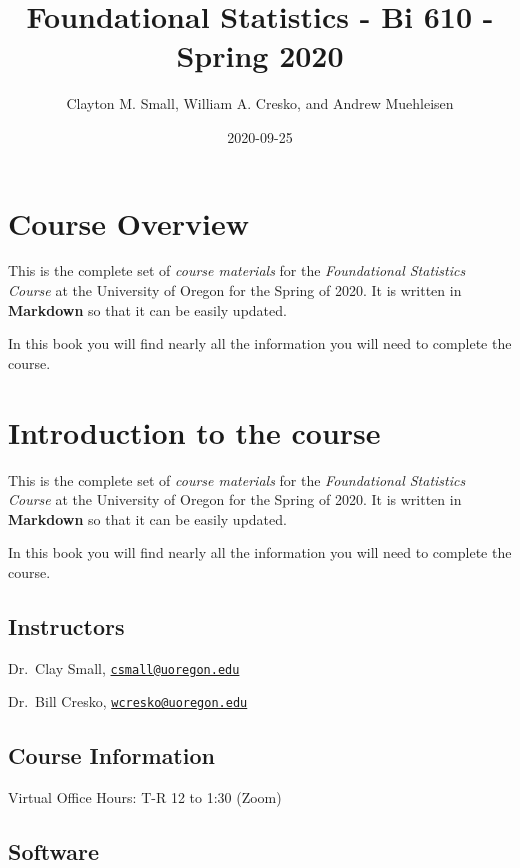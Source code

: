 \documentclass[]{book}
\title{Foundational Statistics - Bi 610 - Spring 2020}
\author{Clayton M. Small, William A. Cresko, and Andrew Muehleisen}
\date{2020-09-25}
\begin{document}
\maketitle

{
\setcounter{tocdepth}{1}
\tableofcontents
}
\hypertarget{course-overview}{%
\chapter{Course Overview}\label{course-overview}}

This is the complete set of \emph{course materials} for the \emph{Foundational Statistics Course} at the University of Oregon for the Spring of 2020. It is written in \textbf{Markdown} so that it can be easily updated.

In this book you will find nearly all the information you will need to complete the course.

\hypertarget{introduction-to-the-course}{%
\chapter{Introduction to the course}\label{introduction-to-the-course}}

This is the complete set of \emph{course materials} for the \emph{Foundational Statistics Course} at the University of Oregon for the Spring of 2020. It is written in \textbf{Markdown} so that it can be easily updated.

In this book you will find nearly all the information you will need to complete the course.

\hypertarget{instructors}{%
\section{Instructors}\label{instructors}}

Dr.~Clay Small, \href{mailto:csmall@uoregon.edu}{\nolinkurl{csmall@uoregon.edu}}

Dr.~Bill Cresko, \href{mailto:wcresko@uoregon.edu}{\nolinkurl{wcresko@uoregon.edu}}

\hypertarget{course-information}{%
\section{Course Information}\label{course-information}}

Virtual Office Hours: T-R 12 to 1:30 (Zoom)

\hypertarget{software}{%
\section{Software}\label{software}}
\end{document}
